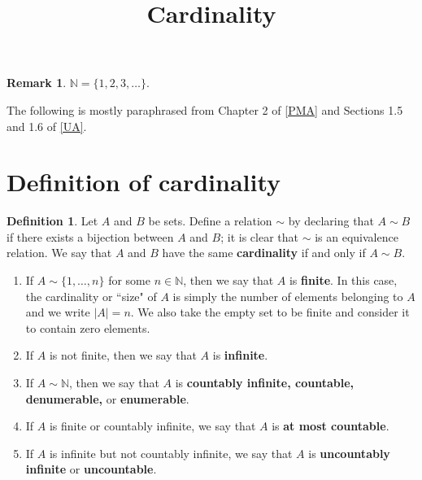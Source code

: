 \documentclass[12pt]{article}
\title{Cardinality}
\author{}
\date{\vspace{-24mm}}
\theoremstyle{definition}
\newtheorem{definition}{Definition}
\newtheorem*{remark}{Remark}
\begin{document}
\maketitle

\tableofcontents

\newpage

\begin{remark}
    \( \mathbb{N} = \{ 1, 2, 3, \ldots \} \).
\end{remark}

\noindent The following is mostly paraphrased from Chapter 2 of \hyperlink{pma}{[PMA]} and Sections 1.5 and 1.6 of \hyperlink{ua}{[UA]}.

\section{Definition of cardinality}
\label{sec:definition_of_cardinality}

\begin{definition}
\label{def:cardinality}
    Let \( A \) and \( B \) be sets. Define a relation \( \sim \) by declaring that \( A \sim B \) if there exists a bijection between \( A \) and \( B \); it is clear that \( \sim \) is an equivalence relation. We say that \( A \) and \( B \) have the same \textbf{cardinality} if and only if \( A \sim B \).
    \begin{enumerate}[label = (\roman*)]
        \item If \( A \sim \{ 1, \ldots, n \} \) for some \( n \in \mathbb{N} \), then we say that \( A \) is \textbf{finite}. In this case, the cardinality or ``size" of \( A \) is simply the number of elements belonging to \( A \) and we write \( |A| = n \). We also take the empty set to be finite and consider it to contain zero elements.

        \item If \( A \) is not finite, then we say that \( A \) is \textbf{infinite}.

        \item If \( A \sim \mathbb{N} \), then we say that \( A \) is \textbf{countably infinite, countable, denumerable,} or \textbf{enumerable}.

        \item If \( A \)  is finite or countably infinite, we say that \( A \) is \textbf{at most countable}.

        \item If \( A \) is infinite but not countably infinite, we say that \( A \) is \textbf{uncountably infinite} or \textbf{uncountable}.
    \end{enumerate}
\end{definition}
\end{document}
